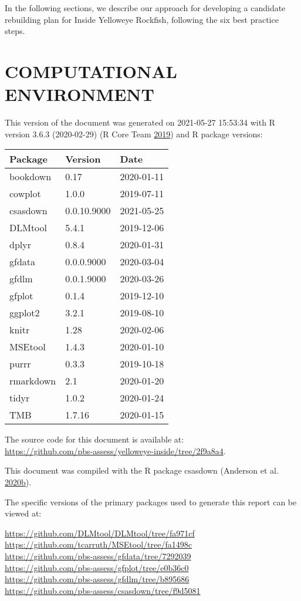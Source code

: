 \documentclass[11pt]{book}
\begin{document}
In the following sections, we describe our approach for developing a candidate rebuilding plan for Inside Yelloweye Rockfish, following the six best practice steps.

\hypertarget{computational-environment}{%
\section{COMPUTATIONAL ENVIRONMENT}\label{computational-environment}}

This version of the document was generated on 2021-05-27 15:53:34 with R version 3.6.3 (2020-02-29) (R Core Team \protect\hyperlink{ref-r2019}{2019}) and R package versions:
\begin{longtable}[]{@{}lll@{}}
\toprule
Package & Version & Date\tabularnewline
\midrule
\endhead
bookdown & 0.17 & 2020-01-11\tabularnewline
cowplot & 1.0.0 & 2019-07-11\tabularnewline
csasdown & 0.0.10.9000 & 2021-05-25\tabularnewline
DLMtool & 5.4.1 & 2019-12-06\tabularnewline
dplyr & 0.8.4 & 2020-01-31\tabularnewline
gfdata & 0.0.0.9000 & 2020-03-04\tabularnewline
gfdlm & 0.0.1.9000 & 2020-03-26\tabularnewline
gfplot & 0.1.4 & 2019-12-10\tabularnewline
ggplot2 & 3.2.1 & 2019-08-10\tabularnewline
knitr & 1.28 & 2020-02-06\tabularnewline
MSEtool & 1.4.3 & 2020-01-10\tabularnewline
purrr & 0.3.3 & 2019-10-18\tabularnewline
rmarkdown & 2.1 & 2020-01-20\tabularnewline
tidyr & 1.0.2 & 2020-01-24\tabularnewline
TMB & 1.7.16 & 2020-01-15\tabularnewline
\bottomrule
\end{longtable}
The source code for this document is available at:\\
\url{https://github.com/pbs-assess/yelloweye-inside/tree/2f9a8a4}.

This document was compiled with the R package csasdown (Anderson et al. \protect\hyperlink{ref-csasdown}{2020}\protect\hyperlink{ref-csasdown}{b}).

The specific versions of the primary packages used to generate this report can be viewed at:

\url{https://github.com/DLMtool/DLMtool/tree/fa971cf}\\
\url{https://github.com/tcarruth/MSEtool/tree/fa1498c}~\\
\url{https://github.com/pbs-assess/gfdata/tree/7292039}~\\
\url{https://github.com/pbs-assess/gfplot/tree/e0b36c0}~\\
\url{https://github.com/pbs-assess/gfdlm/tree/b895686}~\\
\url{https://github.com/pbs-assess/csasdown/tree/f9d5081}~\\
\end{document}
